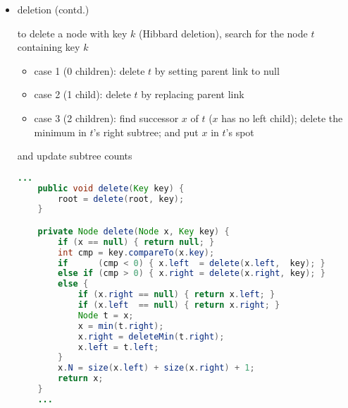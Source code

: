 \documentclass[8pt,a4paper,compress]{beamer}
\begin{document}
\begin{frame}[fragile]
\begin{itemize}
\item deletion (contd.)

\smallskip

to delete a node with key $k$ (Hibbard deletion), search for the node $t$ containing key $k$
\begin{itemize}
\item case 1 (0 children): delete $t$ by setting parent link to null

\item case 2 (1 child): delete $t$ by replacing parent link

\item case 3 (2 children): find successor $x$ of $t$ ($x$ has no left child); delete the minimum in $t$'s right subtree; and put $x$ in $t$'s spot
\end{itemize}
and update subtree counts

\begin{lstlisting}[language=Java]
    ...
    public void delete(Key key) {
        root = delete(root, key);
    }

    private Node delete(Node x, Key key) {
        if (x == null) { return null; }
        int cmp = key.compareTo(x.key);
        if      (cmp < 0) { x.left  = delete(x.left,  key); }
        else if (cmp > 0) { x.right = delete(x.right, key); }
        else { 
            if (x.right == null) { return x.left; }
            if (x.left  == null) { return x.right; }
            Node t = x;
            x = min(t.right);
            x.right = deleteMin(t.right);
            x.left = t.left;
        } 
        x.N = size(x.left) + size(x.right) + 1;
        return x;
    } 
    ...
\end{lstlisting}
\end{itemize}
\end{frame}
\end{document}
